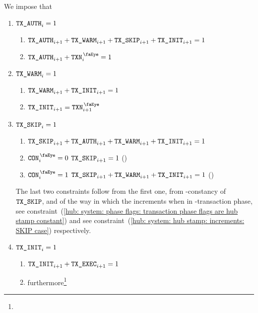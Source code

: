 We impose that
\begin{enumerate}
        \item \If $\texttt{TX}\texttt{\_AUTH} _{i} = 1$ \Then
                \begin{enumerate}
                        \item $\texttt{TX}\texttt{\_AUTH} _{i + 1} + \texttt{TX}\texttt{\_WARM} _{i + 1} + \texttt{TX}\texttt{\_SKIP} _{i + 1} + \texttt{TX}\texttt{\_INIT} _{i + 1} = 1$
                        \item $\txAuth _{i + 1} + \peekTransaction _{i} = 1$
                \end{enumerate}
        \item \If $\texttt{TX}\texttt{\_WARM} _{i} = 1$ \Then
                \begin{enumerate}
                        \item $\texttt{TX}\texttt{\_WARM} _{i + 1} + \texttt{TX}\texttt{\_INIT} _{i + 1} = 1$
                        \item $\txInit _{i + 1} = \peekTransaction _{i + 1}$
                \end{enumerate}
        \item \If $\texttt{TX}\texttt{\_SKIP} _{i} = 1$ \Then
                \begin{enumerate}
                        \item $\texttt{TX}\texttt{\_SKIP} _{i + 1} + \texttt{TX}\texttt{\_AUTH} _{i + 1} + \texttt{TX}\texttt{\_WARM} _{i + 1} + \texttt{TX}\texttt{\_INIT} _{i + 1} = 1$
                        \item \If $\peekContext _{i} = 0$ \Then $\texttt{TX}\texttt{\_SKIP} _{i + 1} = 1$ (\sanityCheck)
                        \item \If $\peekContext _{i} = 1$ \Then $\texttt{TX}\texttt{\_SKIP} _{i + 1} + \texttt{TX}\texttt{\_WARM} _{i + 1} + \texttt{TX}\texttt{\_INIT} _{i + 1} = 1$ (\sanityCheck)
                \end{enumerate}
                \saNote{}
                The last two constraints follow from the first one,
                from \hubStamp-constancy of $\texttt{TX}\texttt{\_SKIP}$,
                and of the way in which the \hubStamp{} increments when in \txSkip-transaction phase,
                see constraint~(\ref{hub: system: phase flags: transaction phase flags are hub stamp constant}) and
                see constraint~(\ref{hub: system: hub stamp: increments: SKIP case}) respectively.
        \item \If $\texttt{TX}\texttt{\_INIT} _{i} = 1$ \Then
                \begin{enumerate}
                        \item $\texttt{TX}\texttt{\_INIT} _{i + 1} + \texttt{TX}\texttt{\_EXEC} _{i + 1} = 1$
                        \item furthermore\footnote{}
                                \[
\]
\end{enumerate}
\end{enumerate}
